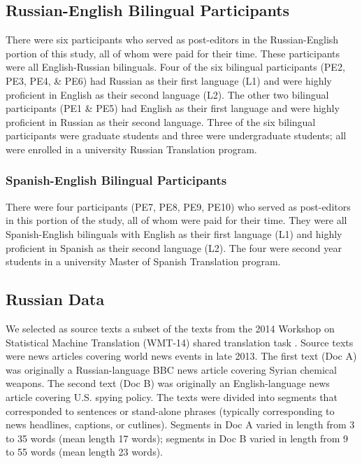 \subsection{Russian-English Bilingual Participants}
There were six participants who served as post-editors in the Russian-English portion of this study, all of whom were paid for their time.
%
These participants were all English-Russian bilinguals.
%
Four of the six bilingual participants (PE2, PE3, PE4, \& PE6) had Russian as their first language (L1) and were highly proficient in English as their second language (L2).
%
The other two bilingual participants (PE1 \& PE5) had English as their first language and were highly proficient in Russian as their second language.
%
Three of the six bilingual participants were graduate students and three were undergraduate students; all were enrolled in a university Russian Translation program. %

%

\subsubsection{Spanish-English Bilingual Participants}

There were four participants (PE7, PE8, PE9, PE10) who served as post-editors in this portion of the study, all of whom were paid for their time. 
%
They were all Spanish-English bilinguals with English as their first language (L1) and highly proficient in Spanish as their second language (L2). 
%
The four were second year students in a university Master of Spanish Translation program. 

\subsection{Russian Data}

We selected as source texts a subset of the texts from the 2014 Workshop on Statistical Machine Translation (WMT-14) shared translation task \citep{2014_WMT_Bojar_etal}.
%
Source texts were news articles covering world news events in late 2013.
%
The first text (Doc A) was originally a Russian-language BBC news article covering Syrian chemical weapons.
%
The second text (Doc B) was originally an English-language news article covering U.S. spying policy.
%
The texts were divided into segments that corresponded to sentences or stand-alone phrases (typically corresponding to news headlines, captions, or cutlines).
%
Segments in Doc A varied in length from 3 to 35 words (mean length 17 words); 
%
segments in Doc B varied in length from 9 to 55 words (mean length 23 words).


